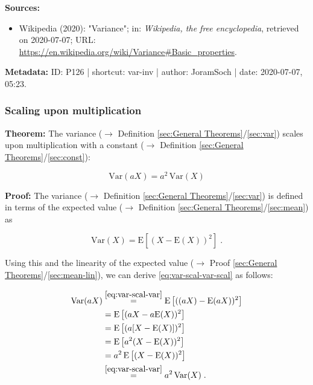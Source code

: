 \documentclass[a4paper,12pt,twoside]{book}
\begin{document}
\vspace{1em}
\textbf{Sources:}
\begin{itemize}
\item Wikipedia (2020): "Variance"; in: \textit{Wikipedia, the free encyclopedia}, retrieved on 2020-07-07; URL: \url{https://en.wikipedia.org/wiki/Variance#Basic_properties}.
\end{itemize}


\vspace{1em}
\textbf{Metadata:} ID: P126 | shortcut: var-inv | author: JoramSoch | date: 2020-07-07, 05:23.
\vspace{1em}



\subsubsection[\textbf{Scaling upon multiplication}]{Scaling upon multiplication} \label{sec:var-scal}
\setcounter{equation}{0}

\textbf{Theorem:} The variance ($\rightarrow$ Definition \ref{sec:General Theorems}/\ref{sec:var}) scales upon multiplication with a constant ($\rightarrow$ Definition \ref{sec:General Theorems}/\ref{sec:const}):

\begin{equation} \label{eq:var-scal-var-scal}
\mathrm{Var}(aX) = a^2 \, \mathrm{Var}(X)
\end{equation}


\vspace{1em}
\textbf{Proof:} The variance ($\rightarrow$ Definition \ref{sec:General Theorems}/\ref{sec:var}) is defined in terms of the expected value ($\rightarrow$ Definition \ref{sec:General Theorems}/\ref{sec:mean}) as

\begin{equation} \label{eq:var-scal-var}
\mathrm{Var}(X) = \mathrm{E}\left[ (X-\mathrm{E}(X))^2 \right] \; .
\end{equation}

Using this and the linearity of the expected value ($\rightarrow$ Proof \ref{sec:General Theorems}/\ref{sec:mean-lin}), we can derive \eqref{eq:var-scal-var-scal} as follows:

\begin{equation} \label{eq:var-scal-var-scal-qed}
\begin{split}
\mathrm{Var}(aX) &\overset{\eqref{eq:var-scal-var}}{=} \mathrm{E}\left[ ((aX)-\mathrm{E}(aX))^2 \right] \\
&= \mathrm{E}\left[ (aX - a\mathrm{E}(X))^2 \right] \\
&= \mathrm{E}\left[ (a [X - \mathrm{E}(X)])^2 \right] \\
&= \mathrm{E}\left[ a^2 (X - \mathrm{E}(X))^2 \right] \\
&= a^2 \, \mathrm{E}\left[ (X - \mathrm{E}(X))^2 \right] \\
&\overset{\eqref{eq:var-scal-var}}{=} a^2 \, \mathrm{Var}(X) \; . \\
\end{split}
\end{equation}
\end{document}
